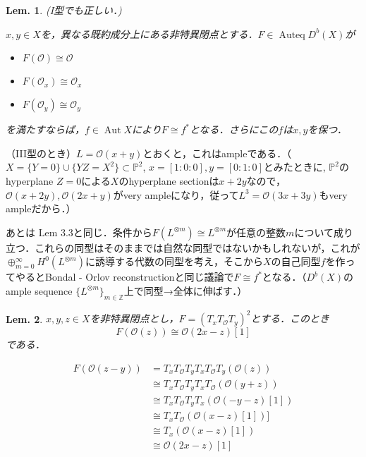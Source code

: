 \documentclass[uplatex,a4paper,11pt]{jsarticle}
\makeatletter
\theoremstyle{mystyle} %
\newtheorem{lemma}{Lem.}[section]
\renewenvironment{proof}[1][\proofname]{\par
 \pushQED{\qed}%
 \normalfont \topsep6\p@\@plus6\p@\relax
 \trivlist
 \item[\hskip\labelsep
 \itshape
 {\bf\underline{#1}}]\ignorespaces
}{%
 \popQED\endtrivlist\@endpefalse
}
\DeclareMathOperator{\Aut}{Aut}
\DeclareMathOperator{\Auteq}{Auteq}
\makeatother
\begin{document}
\begin{lemma}\label{criterion_to_be_id}
	(I型でも正しい．)

	$x, y \in X$を，異なる既約成分上にある非特異閉点とする．$F \in \Auteq{D^b(X)}$が
	\begin{itemize}
		\item $F(\mathcal{O}) \cong \mathcal{O}$
		\item $F(\mathcal{O}_x) \cong \mathcal{O}_x$
		\item $F(\mathcal{O}_y) \cong \mathcal{O}_y$
	\end{itemize}
	を満たすならば，$f \in \Aut{X}$により$F\cong f^*$となる．さらにこの$f$は$x,y$を保つ．
\end{lemma}
\begin{proof}
	（I\hspace{ - .1em}I\hspace{ - .1em}I型のとき）$L=\mathcal{O}(x + y)$とおくと，これはampleである．（$X=\{Y=0\}\cup\{YZ=X^2\} \subset \mathbb{P}^2$, $x=[1:0:0], y=[0:1:0]$とみたときに,
	$\mathbb{P}^2$のhyperplane $Z=0$による$X$のhyperplane sectionは$x + 2y$なので，$\mathcal{O}(x + 2y), \mathcal{O}(2x + y)$がvery ampleになり，従って$L^3=\mathcal{O}(3x + 3y)$もvery ampleだから．）

	あとは\cite{Sib14} Lem 3.3と同じ．条件から$F(L^{\otimes m})\cong L^{\otimes m}$が任意の整数$m$について成り立つ．これらの同型はそのままでは自然な同型ではないかもしれないが，これが$\oplus_{m=0}^\infty H^0(L^{\otimes m})$に誘導する代数の同型を考え，そこから$X$の自己同型$f$を作ってやるとBondal - Orlov reconstructionと同じ議論で$F \cong f^*$となる．（$D^b(X)$の ample sequence $\{L^{\otimes m}\}_{m \in \mathbb{Z}}$上で同型→全体に伸ばす．）
\end{proof}
\begin{lemma}\label{calc_around_z}
	$x, y, z \in X$を非特異閉点とし，$F=(T_xT_\mathcal{O}T_y)^2$とする．このとき$$F(\mathcal{O}(z))\cong \mathcal{O}(2x - z)[1]$$である．
\end{lemma}
\begin{proof}
	\begin{align}
		F(\mathcal{O}(z - y))
		 & = T_xT_\mathcal{O}T_yT_xT_\mathcal{O}T_y(\mathcal{O}(z))      \\
		 & \cong T_xT_\mathcal{O}T_yT_xT_\mathcal{O}(\mathcal{O}(y + z)) \\
		 & \cong T_xT_\mathcal{O}T_yT_x(\mathcal{O}( - y - z)[1])        \\
		 & \cong T_xT_\mathcal{O}(\mathcal{O}(x - z)[1])]                \\
		 & \cong T_x(\mathcal{O}(x - z)[1])                              \\
		 & \cong \mathcal{O}(2x - z)[1]
	\end{align}
\end{proof}
\end{document}
